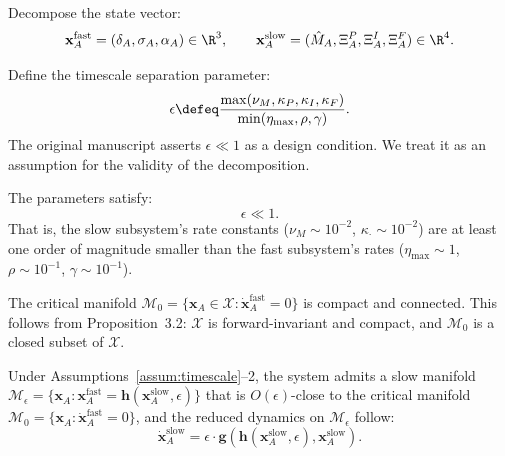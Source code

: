 
\begin{definition}
Decompose the state vector:
\[
\mathbf{x}_A^{\text{fast}} = (\delta_A, \sigma_A, \alpha_A) \in \R^3,
\qquad
\mathbf{x}_A^{\text{slow}} = (\hat{M}_A, \Xi_A^P, \Xi_A^I, \Xi_A^F) \in \R^4.
\]
\end{definition}

\begin{definition}
Define the timescale separation parameter:
\[
\epsilon \defeq \frac{\max(\nu_M, \kappa_P, \kappa_I, \kappa_F)}{\min(\eta_{\max}, \rho, \gamma)}.
\]
The original manuscript asserts $\epsilon \ll 1$ as a design condition.
We treat it as an assumption for the validity of the decomposition.
\end{definition}

\begin{assumption}
\label{assum:timescale}
The parameters satisfy:
\[
\epsilon \ll 1.
\]
That is, the slow subsystem's rate constants ($\nu_M \sim 10^{-2}$,
$\kappa_{\cdot} \sim 10^{-2}$) are at least one order of magnitude
smaller than the fast subsystem's rates ($\eta_{\max} \sim 1$,
$\rho \sim 10^{-1}$, $\gamma \sim 10^{-1}$).
\end{assumption}

\begin{assumption}
The critical manifold $\mathcal{M}_0 = \{ \mathbf{x}_A \in \mathcal{X} :
\dot{\mathbf{x}}_A^{\text{fast}} = 0 \}$ is compact and connected.
This follows from Proposition~3.2: $\mathcal{X}$ is forward-invariant
and compact, and $\mathcal{M}_0$ is a closed subset of $\mathcal{X}$.
\end{assumption}

\begin{proposition}
\label{prop:fenichel}
Under Assumptions~\ref{assum:timescale}--2, the system admits a slow
manifold $\mathcal{M}_\epsilon = \{ \mathbf{x}_A :
\mathbf{x}_A^{\text{fast}} = \mathbf{h}(\mathbf{x}_A^{\text{slow}}, \epsilon) \}$
that is $O(\epsilon)$-close to the critical manifold
$\mathcal{M}_0 = \{ \mathbf{x}_A : \dot{\mathbf{x}}_A^{\text{fast}} = 0 \}$,
and the reduced dynamics on $\mathcal{M}_\epsilon$ follow:
\[
\dot{\mathbf{x}}_A^{\text{slow}} = \epsilon \cdot
\mathbf{g}(\mathbf{h}(\mathbf{x}_A^{\text{slow}}, \epsilon),
\mathbf{x}_A^{\text{slow}}).
\]
\end{proposition}


